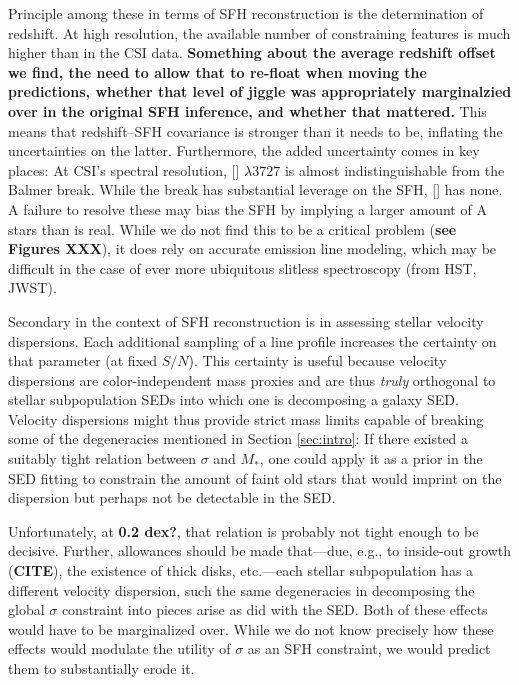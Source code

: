 \documentclass[a4paper,fleqn,usenatbib]{mnras}
\newcommand{\Mstel}{M_\ast}
\newcommand{\bfr}{\bf\color{red}}
\newcommand{\CITE}{{\bfr CITE}}
\begin{document}
Principle among these in terms of SFH reconstruction is the determination of redshift. At high 
resolution, the available number
of constraining features is much higher than in the CSI data. {\bfr Something about the average
redshift offset we find, the need to allow that to re-float when moving the predictions, whether
that level of jiggle was appropriately marginalzied over in the original SFH inference, and whether
that mattered.} This means that redshift--SFH covariance is stronger than it needs to be, inflating 
the uncertainties on the latter. Furthermore, the added uncertainty comes in key places: At CSI's 
spectral resolution, [] $\lambda 3727$ is almost indistinguishable from the Balmer break. 
While the break has substantial leverage on the SFH, [] has none. A failure to resolve these 
may bias the SFH by implying a larger amount of A stars than is real. While we do not find this to 
be a critical problem ({\bfr see Figures XXX}), it does rely on accurate emission line modeling, 
which may be difficult in the case of ever more ubiquitous slitless spectroscopy (from HST, JWST). 

Secondary in the context of SFH reconstruction is in assessing stellar velocity dispersions. Each 
additional sampling of a line profile increases the certainty on that parameter (at fixed $S/N$). 
This certainty is useful because velocity dispersions are color-independent mass proxies and are 
thus {\it truly} orthogonal to stellar subpopulation SEDs into which one is decomposing a galaxy SED.
Velocity dispersions might thus provide strict mass limits capable of breaking some of the degeneracies 
mentioned in Section \ref{sec:intro}: If there existed a suitably tight relation between $\sigma$
and $\Mstel$, one could apply it as a prior in the SED fitting to constrain the amount of faint old 
stars that would imprint on the dispersion but perhaps not be detectable in the SED.

Unfortunately, at {\bfr 0.2 dex?}, that relation is probably not tight enough to be decisive. Further,
allowances should be made that---due, e.g., to inside-out growth (\CITE), the existence of thick disks, 
etc.---each stellar subpopulation has a different velocity dispersion, such the same degeneracies in
decomposing the global $\sigma$ constraint into pieces arise as did with the SED. Both of these 
effects would have to be marginalized over. While we do not know precisely how these effects 
would modulate the utility of $\sigma$ as an SFH constraint, we would predict them to 
substantially erode it.
\end{document}
